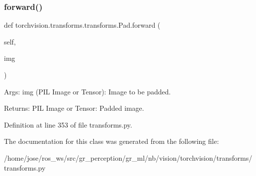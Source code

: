 \subsubsection{\texorpdfstring{forward()}{forward()}}
{\footnotesize\ttfamily def torchvision.\+transforms.\+transforms.\+Pad.\+forward (\begin{DoxyParamCaption}\item[{}]{self,  }\item[{}]{img }\end{DoxyParamCaption})}

\begin{DoxyVerb}Args:
    img (PIL Image or Tensor): Image to be padded.

Returns:
    PIL Image or Tensor: Padded image.
\end{DoxyVerb}
 

Definition at line 353 of file transforms.\+py.



The documentation for this class was generated from the following file\+:\begin{DoxyCompactItemize}
\item 
/home/jose/ros\+\_\+ws/src/gr\+\_\+perception/gr\+\_\+ml/nb/vision/torchvision/transforms/transforms.\+py\end{DoxyCompactItemize}
